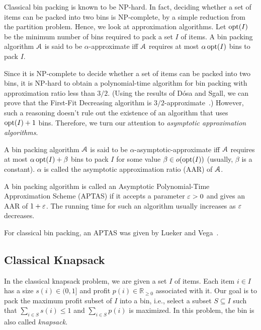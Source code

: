 Classical bin packing is known to be NP-hard.
In fact, deciding whether a set of items can be packed into two bins is NP-complete,
by a simple reduction from the partition problem.
Hence, we look at approximation algorithms.
Let $\operatorname{opt}(I)$ be the minimum number of bins required to pack a set $I$ of items.
A bin packing algorithm $\mathcal{A}$ is said to be $\alpha$-approximate iff
$\mathcal{A}$ requires at most $\alpha\operatorname{opt}(I)$ bins to pack $I$.

Since it is NP-complete to decide whether a set of items can be packed into two bins,
it is NP-hard to obtain a polynomial-time algorithm for bin packing
with approximation ratio less than $3/2$.
(Using the results of D\'osa and Sgall, we can prove that the First-Fit Decreasing algorithm
is $3/2$-approximate~\cite{dosa2013first,dosa2007tight}.)
However, such a reasoning doesn't rule out the existence of an algorithm
that uses $\operatorname{opt}(I) + 1$ bins.
Therefore, we turn our attention to \emph{asymptotic approximation algorithms}.
\begin{definition}
A bin packing algorithm $\mathcal{A}$ is said to be $\alpha$-asymptotic-approximate iff
$\mathcal{A}$ requires at most $\alpha\operatorname{opt}(I) + \beta$ bins to pack $I$
for some value $\beta \in o(\operatorname{opt}(I))$ (usually, $\beta$ is a constant).
$\alpha$ is called the asymptotic approximation ratio (AAR) of $\mathcal{A}$.
\end{definition}
\begin{definition}[APTAS]
A bin packing algorithm is called an Asymptotic Polynomial-Time Approximation Scheme (APTAS)
if it accepts a parameter $\varepsilon > 0$ and gives an AAR of $1+\varepsilon$.
The running time for such an algorithm usually increases as $\varepsilon$ decreases.
\end{definition}

For classical bin packing, an APTAS was given by Lueker and Vega~\cite{bp-aptas}.

\subsection{Classical Knapsack}

In the classical knapsack problem, we are given a set $I$ of items.
Each item $i \in I$ has a size $s(i) \in (0, 1]$
and profit $p(i) \in \mathbb{R}_{\ge 0}$ associated with it.
Our goal is to pack the maximum profit subset of $I$ into a bin,
i.e., select a subset $S \subseteq I$ such that
$\sum_{i \in S} s(i) \le 1$ and $\sum_{i \in S} p(i)$ is maximized.
In this problem, the bin is also called \emph{knapsack}.

